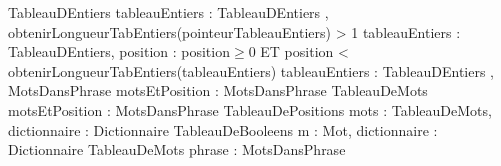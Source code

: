 \begin{algorithme}
		{}%
		{TableauDEntiers}
	\smallskip
		{tableauEntiers : TableauDEntiers}%
		{\naturel}
	\smallskip	
		{, }%
		{obtenirLongueurTabEntiers(pointeurTableauEntiers) > 1}
	\smallskip	
		{tableauEntiers : TableauDEntiers, position : \naturel}%
		{\entier}%
		{position$\geq$0 ET position < obtenirLongueurTabEntiers(tableauEntiers)}
	\smallskip
		{tableauEntiers : TableauDEntiers}%
		{}
	\smallskip	
		{,  }%
		{}
	\smallskip
		{}%
		{}
	\smallskip	
		{}%
		{MotsDansPhrase}
	\smallskip
		{motsEtPosition : MotsDansPhrase}%
		{TableauDeMots}
	\smallskip
		{motsEtPosition : MotsDansPhrase}%
		{TableauDePositions}
	\smallskip
		{mots : TableauDeMots, dictionnaire : Dictionnaire}%
		{TableauDeBooleens}
	\smallskip
		{m : Mot, dictionnaire : Dictionnaire}%
		{TableauDeMots}
	\smallskip
		{phrase : \chaine}%
		{MotsDansPhrase}
\end{algorithme}
